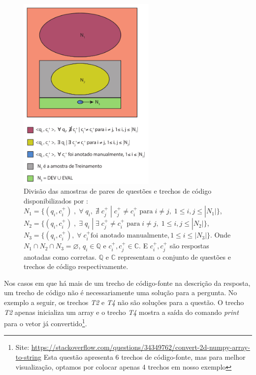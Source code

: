 \begin{figure}[h]
\centering
\includegraphics[width=0.6\textwidth]{figuras/cap-experimento/distinct-subsets-yao-sample.pdf}
\caption{Divisão das amostras de pares de questões e trechos de código disponibilizados por \cite{yao-2018}: $N_{1} = \{(q_{i}, c_{i}^{+})\;,\; \forall\; q_{i},\;\nexists\; c_{j}^{+}\; |\; c_{j}^{+} \neq c_{i}^{+}\; \text{para}\; i \neq j,\; 1 \leq i,j \leq |N_{1}| \}$, $N_{2} = \{(q_{i}, c_{i}^{+})\;,\; \exists\; q_{i}\; | \;\exists\; c_{j}^{+} \neq c_{i}^{+}\; \text{para} \; i \neq j,\; 1 \leq i,j \leq |N_{2}| \}$, $N_{3} = \{(q_{i}, c_{i}^{+}),\; \forall\; c_{i}^{+} \text{foi anotado manualmente}, 1 \leq i \leq |N_{3}| \}$. Onde $N_{1} \cap N_{2} \cap N_{3} = \varnothing$, $q_{i} \in \mathbb{Q}$ e $c_{i}^{+},  c_{j}^{+} \in \mathbb{C}$. E $c_{i}^{+}, c_{j}^{+}$ são respostas anotadas como corretas. $\mathbb{Q}$ e $\mathbb{C}$ representam o conjunto de questões e trechos de código respectivamente.} 
\label{fig:distinct-subset-python-pair-question-code}
\end{figure}

Nos casos em que há mais de um trecho de código-fonte na descrição da resposta, um trecho de código não é necessariamente uma solução para a pergunta. No exemplo a seguir, os trechos \emph{T2} e \emph{T4} não são soluções para a questão. O trecho \emph{T2} apenas inicializa um array e o trecho \emph{T4} mostra a saída do comando \textit{print} para o vetor já convertido\footnote{Site: \url{https://stackoverflow.com/questions/34349762/convert-2d-numpy-array-to-string} Esta questão apresenta 6 trechos de código-fonte, mas para melhor visualização, optamos por colocar apenas 4 trechos em nosso exemplo\label{foot:exemplo-stackoverflow-mais-de-um-trecho}}.



